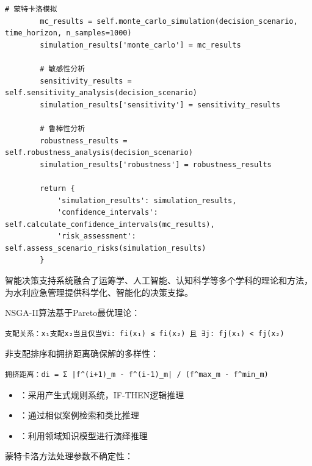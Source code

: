 \begin{lstlisting}[style=python]
        # 蒙特卡洛模拟
        mc_results = self.monte_carlo_simulation(decision_scenario, time_horizon, n_samples=1000)
        simulation_results['monte_carlo'] = mc_results
        
        # 敏感性分析
        sensitivity_results = self.sensitivity_analysis(decision_scenario)
        simulation_results['sensitivity'] = sensitivity_results
        
        # 鲁棒性分析
        robustness_results = self.robustness_analysis(decision_scenario)
        simulation_results['robustness'] = robustness_results
        
        return {
            'simulation_results': simulation_results,
            'confidence_intervals': self.calculate_confidence_intervals(mc_results),
            'risk_assessment': self.assess_scenario_risks(simulation_results)
        }
\end{lstlisting}


智能决策支持系统融合了运筹学、人工智能、认知科学等多个学科的理论和方法，为水利应急管理提供科学化、智能化的决策支撑。


NSGA-II算法基于Pareto最优理论：

\begin{lstlisting}
支配关系：x₁支配x₂当且仅当∀i: fi(x₁) ≤ fi(x₂) 且 ∃j: fj(x₁) < fj(x₂)
\end{lstlisting}

非支配排序和拥挤距离确保解的多样性：

\begin{lstlisting}
拥挤距离：di = Σ |f^(i+1)_m - f^(i-1)_m| / (f^max_m - f^min_m)
\end{lstlisting}


\begin{itemize}
\tightlist
\item
  ：采用产生式规则系统，IF-THEN逻辑推理
\item
  ：通过相似案例检索和类比推理
\item
  ：利用领域知识模型进行演绎推理
\end{itemize}


蒙特卡洛方法处理参数不确定性：

